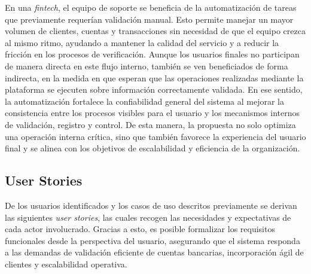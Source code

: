 En una \textit{fintech}, el equipo de soporte se beneficia de la automatización de tareas que previamente requerían validación manual. Esto permite manejar un mayor volumen de clientes, cuentas y transacciones sin necesidad de que el equipo crezca al mismo ritmo, ayudando a mantener la calidad del servicio y a reducir la fricción en los procesos de verificación. Aunque los usuarios finales no participan de manera directa en este flujo interno, también se ven beneficiados de forma indirecta, en la medida en que esperan que las operaciones realizadas mediante la plataforma se ejecuten sobre información correctamente validada. En ese sentido, la automatización fortalece la confiabilidad general del sistema al mejorar la consistencia entre los procesos visibles para el usuario y los mecanismos internos de validación, registro y control. De esta manera, la propuesta no solo optimiza una operación interna crítica, sino que también favorece la experiencia del usuario final y se alinea con los objetivos de escalabilidad y eficiencia de la organización.


\subsection{User Stories}

De los usuarios identificados y los casos de uso descritos previamente se derivan las siguientes \textit{user stories}, las cuales recogen las necesidades y expectativas de cada actor involucrado. Gracias a esto, es posible formalizar los requisitos funcionales desde la perspectiva del usuario, asegurando que el sistema responda a las demandas de validación eficiente de cuentas bancarias, incorporación ágil de clientes y escalabilidad operativa.


